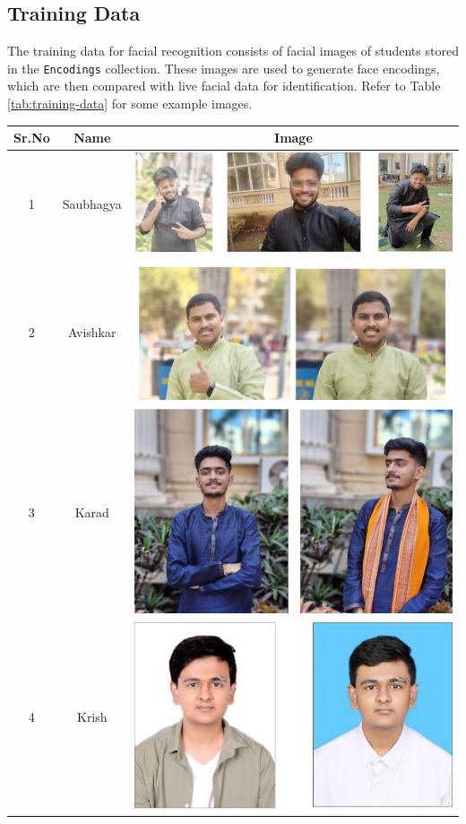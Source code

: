 \documentclass[conference]{IEEEtran}
\begin{document}
\subsection{Training Data}
The training data for facial recognition consists of facial images of students stored in the \texttt{Encodings} collection. These images are used to generate face encodings, which are then compared with live facial data for identification. Refer to Table \ref{tab:training-data} for some example images.
\begin{table}[h]
    \centering
    \begin{tabular}{|c|c|c|}
        \hline
        \textbf{Sr.No} & \textbf{Name} & \textbf{Image}                                        \\
        \hline
        1              & Saubhagya     & \includegraphics[height=.25\textwidth]{saubhagya.jpg} \\
        \hline
        2              & Avishkar      & \includegraphics[height=.25\textwidth]{avishkar.jpg}  \\
        \hline
        3              & Karad         & \includegraphics[height=.25\textwidth]{karad.jpg}     \\
        \hline
        4              & Krish         & \includegraphics[height=.25\textwidth]{krish.jpg}     \\

\end{tabular}
\end{table}
\end{document}

